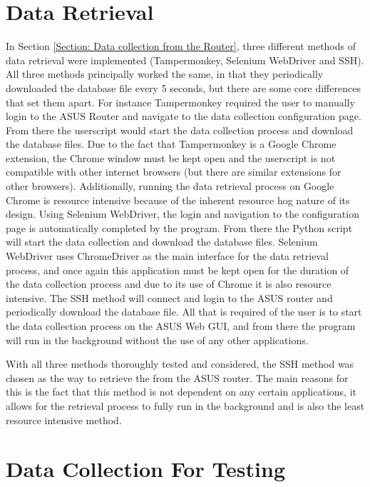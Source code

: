 

\section{Data Retrieval} \label{Section: Testing Data Retrieval}

In Section \ref{Section: Data collection from the Router}, three different methods of data retrieval were implemented (Tampermonkey, Selenium WebDriver and SSH). All three methods principally worked the same, in that they periodically downloaded the database file every 5 seconds, but there are some core differences that set them apart. For instance Tampermonkey required the user to manually login to the ASUS Router and navigate to the data collection configuration page. From there the userscript would start the data collection process and download the database files. Due to the fact that Tampermonkey is a Google Chrome extension, the Chrome window must be kept open and the userscript is not compatible with other internet browsers (but there are similar extensions for other browsers). Additionally, running the data retrieval process on Google Chrome is resource intensive because of the inherent resource hog nature of its design. Using Selenium WebDriver, the login and navigation to the configuration page is automatically completed by the program. From there the Python script will start the data collection and download the database files. Selenium WebDriver uses ChromeDriver as the main interface for the data retrieval process, and once again this application must be kept open for the duration of the data collection process and due to its use of Chrome it is also resource intensive. The SSH method will connect and login to the ASUS router and periodically download the database file. All that is required of the user is to start the data collection process on the ASUS Web GUI, and from there the program will run in the background without the use of any other applications. 

With all three methods thoroughly tested and considered, the SSH method was chosen as the way to retrieve the from the ASUS router. The main reasons for this is the fact that this method is not dependent on any certain applications, it allows for the retrieval process to fully run in the background and is also the least resource intensive method.

\section{Data Collection For Testing}

